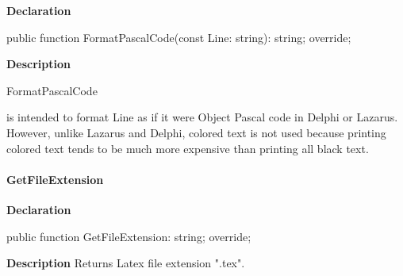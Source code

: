 \documentclass{report}
\newif\ifpdf
\begin{document}
\label{PasDoc_GenLatex.TTexDocGenerator-FormatPascalCode}
\begin{list}{}{
\setlength{\itemindent}{0cm}
\setlength{\listparindent}{0cm}
\setlength{\leftmargin}{\evensidemargin}
\addtolength{\leftmargin}{\tmplength}
\settowidth{\labelsep}{X}
\addtolength{\leftmargin}{\labelsep}
\setlength{\labelwidth}{\tmplength}
}
\item[\textbf{Declaration}\hfill]
\ifpdf
\begin{flushleft}
\fi
\begin{ttfamily}
public function FormatPascalCode(const Line: string): string; override;\end{ttfamily}

\ifpdf
\end{flushleft}
\fi

\par
\item[\textbf{Description}]
\begin{ttfamily}FormatPascalCode\end{ttfamily} is intended to format Line as if it were Object Pascal code in Delphi or Lazarus. However, unlike Lazarus and Delphi, colored text is not used because printing colored text tends to be much more expensive than printing all black text.

\end{list}
\paragraph*{GetFileExtension}\hspace*{\fill}

\label{PasDoc_GenLatex.TTexDocGenerator-GetFileExtension}
\begin{list}{}{
\setlength{\itemindent}{0cm}
\setlength{\listparindent}{0cm}
\setlength{\leftmargin}{\evensidemargin}
\addtolength{\leftmargin}{\tmplength}
\settowidth{\labelsep}{X}
\addtolength{\leftmargin}{\labelsep}
\setlength{\labelwidth}{\tmplength}
}
\item[\textbf{Declaration}\hfill]
\ifpdf
\begin{flushleft}
\fi
\begin{ttfamily}
public function GetFileExtension: string; override;\end{ttfamily}

\ifpdf
\end{flushleft}
\fi

\par
\item[\textbf{Description}]
Returns Latex file extension ".tex".

\end{list}
\end{document}
